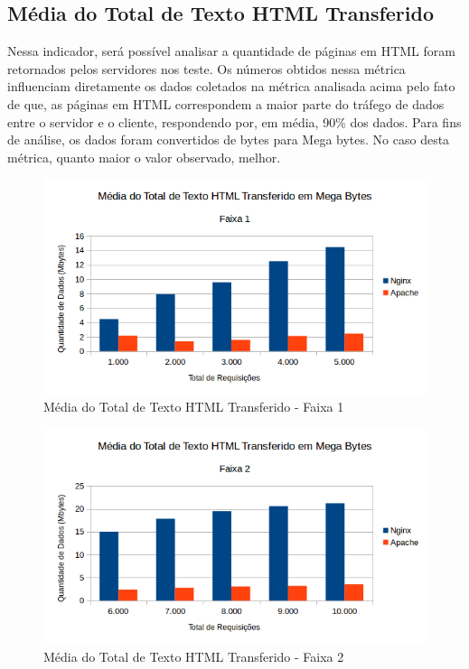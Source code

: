\subsection{Média do Total de Texto HTML Transferido}
Nessa indicador, será possível analisar a quantidade de páginas em HTML foram 
retornados pelos servidores nos teste. Os números obtidos nessa métrica 
influenciam diretamente os dados coletados na métrica analisada acima pelo fato 
de que, as páginas em HTML correspondem a maior parte do tráfego de dados entre 
o servidor e o cliente, respondendo por, em média, 90\% dos dados. Para fins de 
análise, os dados foram convertidos de bytes para Mega bytes. No caso desta 
métrica, quanto maior o valor observado, melhor.
\begin{figure}[H]
	\centering
	\includegraphics[width=1\linewidth]{graficos/grafico3-f1} 
	\caption{Média do Total de Texto HTML Transferido - Faixa 1}
	\label{fig:grafico3-f1}
\end{figure}
\begin{figure}[H]
	\centering
	\includegraphics[width=1\linewidth]{graficos/grafico3-f2} 
	\caption{Média do Total de Texto HTML Transferido - Faixa 2}
	\label{fig:grafico3-f2}
\end{figure}
